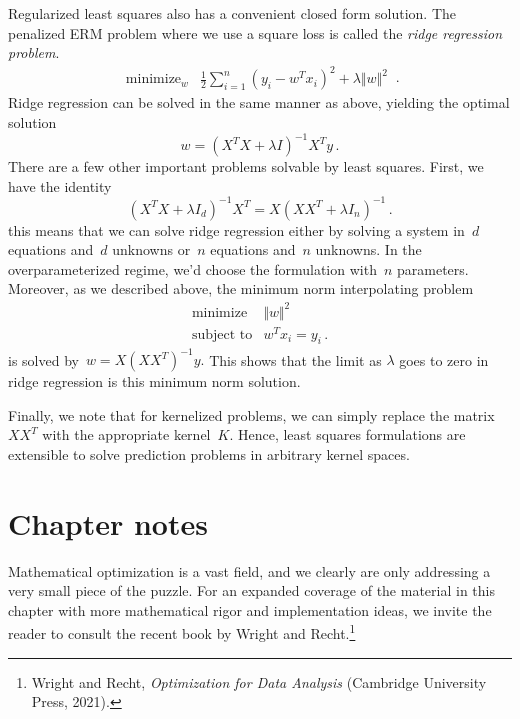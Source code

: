 \documentclass{tufte-book}
\begin{document}
Regularized least squares also has a convenient closed form solution.
The penalized ERM problem where we use a square loss is called the
\emph{ridge regression problem}. \[
\begin{array}{ll}
    \text{minimize}_w  & \tfrac{1}{2}\sum_{i=1}^n (y_i-w^T x_i)^2 +\lambda \Vert w\Vert^2
    \end{array}\,.
\] Ridge regression can be solved in the same manner as above, yielding
the optimal solution \[
    w = (X^T X+ \lambda I)^{-1} X^T y\,.
\] There are a few other important problems solvable by least squares.
First, we have the identity \[
    (X^T X+ \lambda I_d)^{-1} X^T = X (X X^T+ \lambda I_n)^{-1}\,.
\] this means that we can solve ridge regression either by solving a
system in~\(d\) equations and~\(d\) unknowns or~\(n\) equations
and~\(n\) unknowns. In the overparameterized regime, we'd choose the
formulation with~\(n\) parameters. Moreover, as we described above, the
minimum norm interpolating problem \[
\begin{array}{ll}
    \text{minimize} & \Vert w \Vert^2\\
    \text{subject to} & w^Tx_i = y_i\,.
\end{array}
\] is solved by~\(w= X (X X^T)^{-1}y.\) This shows that the limit as
\(\lambda\) goes to zero in ridge regression is this minimum norm
solution.

Finally, we note that for kernelized problems, we can simply replace the
matrix~\(X X^T\) with the appropriate kernel~\(K\). Hence, least squares
formulations are extensible to solve prediction problems in arbitrary
kernel spaces.

\hypertarget{chapter-notes-4}{%
\section{Chapter notes}\label{chapter-notes-4}}

Mathematical optimization is a vast field, and we clearly are only
addressing a very small piece of the puzzle. For an expanded coverage of
the material in this chapter with more mathematical rigor and
implementation ideas, we invite the reader to consult the recent book by
Wright and Recht.\footnote{Wright and Recht, \emph{Optimization for Data
  Analysis} (Cambridge University Press, 2021).}
\end{document}
